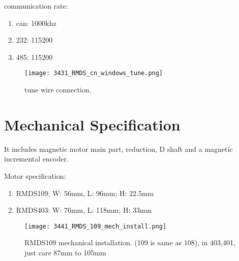 communication rate:
\begin{enumerate}
	\item can: 1000khz
	\item 232: 115200
	\item 485: 115200
\end{enumerate}

\begin{figure}[htb]
	\texttt{[image: 3431\_RMDS\_cn\_windows\_tune.png]}
	\caption[tune wire connection]{ 
		tune wire connection.		 
		}
\end{figure}


\section{Mechanical Specification}
It includes magnetic motor main part, reduction,  D shaft and a magnetic incremental encoder.

Motor specification:
\begin{enumerate}
	\item RMDS109:  W: 56mm, L: 96mm; H: 22.5mm
	\item RMDS403: W: 76mm, L: 118mm; H: 33mm
\end{enumerate}

\begin{figure}[htb]
	\texttt{[image: 3441\_RMDS\_109\_mech\_install.png]}
	\caption[RMDS109 mechanical installation]{ 
		RMDS109 mechanical installation. (109 is same as 108), in 403,401, just care 87mm to 105mm		 
		}
\end{figure}

